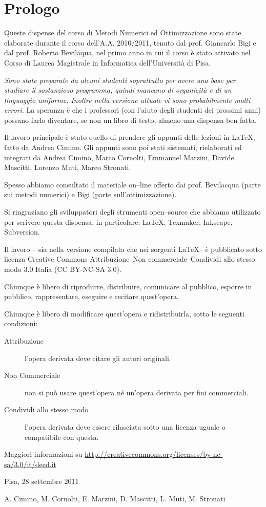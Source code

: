 \chapter*{Prologo}
Queste dispense del corso di Metodi Numerici ed Ottimizzazione sono state elaborate durante il corso dell'A.A. 2010/2011, tenuto dal prof. Giancarlo Bigi e dal prof. Roberto Bevilaqua, nel primo anno in cui il corso è stato attivato nel Corso di Laurea Magistrale in Informatica dell'Università di Pisa.

{\em Sono state preparate da alcuni studenti soprattutto per avere una base per studiare il sostanzioso programma,  quindi mancano di organicità e di un linguaggio uniforme. Inoltre nella versione attuale vi sono probabilmente molti errori}. La speranza è che i professori (con l'aiuto degli studenti dei prossimi anni) possano farlo diventare, se non un libro di testo, almeno una dispensa ben fatta.

Il lavoro principale è stato quello di prendere gli appunti delle lezioni in \LaTeX , fatto da Andrea Cimino. Gli appunti sono poi stati sistemati, rielaborati ed integrati da Andrea Cimino, Marco Cornolti, Emmanuel Marzini, Davide Mascitti, Lorenzo Muti, Marco Stronati.

Spesso abbiamo consultato il materiale on--line offerto dai prof. Bevilacqua (parte sui metodi numerici) e Bigi (parte sull'ottimizzazione).

Si ringraziano gli sviluppatori degli strumenti open--source che abbiamo utilizzato per scrivere questa dispensa, in particolare: \LaTeX, Texmaker, Inkscape, Subversion.

Il lavoro -- sia nella versione compilata che nei sorgenti \LaTeX -- è pubblicato sotto licenza Creative Commons Attribuzione--Non commerciale--Condividi allo stesso modo 3.0 Italia (CC BY-NC-SA 3.0).

Chiunque è libero di riprodurre, distribuire, comunicare al pubblico, esporre in pubblico, rappresentare, eseguire e recitare quest'opera.

Chiunque è libero di modificare quest'opera e ridistribuirla, sotto le seguenti condizioni:
\begin{description}
\item[Attribuzione] l'opera derivata deve citare gli autori originali.
\item[Non Commerciale] non si può usare quest'opera né un'opera derivata per fini commerciali.
\item[Condividi allo stesso modo] l'opera derivata deve essere rilasciata sotto una licenza uguale o compatibile con questa.
\end{description}

Maggiori informazioni su \url{http://creativecommons.org/licenses/by-nc-sa/3.0/it/deed.it}

\vspace{1cm}
\begin{flushright}
Pisa, 28 settembre 2011
\end{flushright}

\vfill
\byncsa A. Cimino, M. Cornolti, E. Marzini, D. Mascitti, L. Muti, M. Stronati

